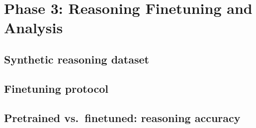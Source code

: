 \documentclass[10pt]{article}
\begin{document}
\section{Phase 3: Reasoning Finetuning and Analysis}

\subsection{Synthetic reasoning dataset}

\subsection{Finetuning protocol}

\subsection{Pretrained vs.\ finetuned: reasoning accuracy}
\end{document}
